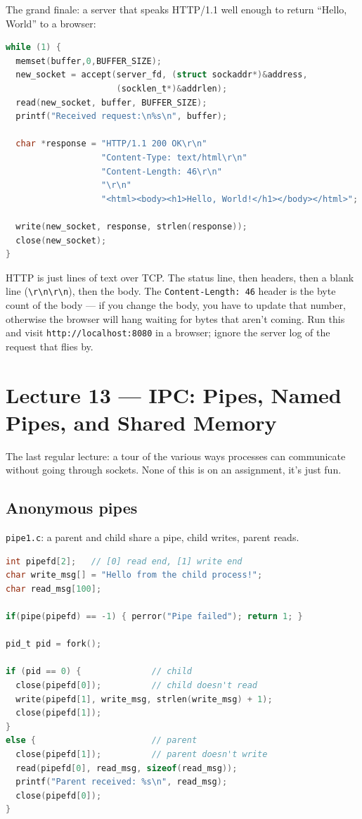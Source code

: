\documentclass[11pt]{article}
\begin{document}
The grand finale: a server that speaks HTTP/1.1 well enough to
return ``Hello, World'' to a browser:

\begin{lstlisting}[language=C]
while (1) {
  memset(buffer,0,BUFFER_SIZE);
  new_socket = accept(server_fd, (struct sockaddr*)&address,
                      (socklen_t*)&addrlen);
  read(new_socket, buffer, BUFFER_SIZE);
  printf("Received request:\n%s\n", buffer);

  char *response = "HTTP/1.1 200 OK\r\n"
                   "Content-Type: text/html\r\n"
                   "Content-Length: 46\r\n"
                   "\r\n"
                   "<html><body><h1>Hello, World!</h1></body></html>";

  write(new_socket, response, strlen(response));
  close(new_socket);
}
\end{lstlisting}

HTTP is just lines of text over TCP. The status line, then headers,
then a blank line (\texttt{\textbackslash r\textbackslash n\textbackslash r\textbackslash n}),
then the body. The \texttt{Content-Length: 46} header is the byte
count of the body --- if you change the body, you have to update
that number, otherwise the browser will hang waiting for bytes that
aren't coming. Run this and visit \texttt{http://localhost:8080} in
a browser; ignore the server log of the request that flies by.

\section{Lecture 13 --- IPC: Pipes, Named Pipes, and Shared Memory}

The last regular lecture: a tour of the various ways processes can
communicate without going through sockets. None of this is on an
assignment, it's just fun.

\subsection*{Anonymous pipes}

\texttt{pipe1.c}: a parent and child share a pipe, child writes,
parent reads.

\begin{lstlisting}[language=C]
int pipefd[2];   // [0] read end, [1] write end
char write_msg[] = "Hello from the child process!";
char read_msg[100];

if(pipe(pipefd) == -1) { perror("Pipe failed"); return 1; }

pid_t pid = fork();

if (pid == 0) {              // child
  close(pipefd[0]);          // child doesn't read
  write(pipefd[1], write_msg, strlen(write_msg) + 1);
  close(pipefd[1]);
}
else {                       // parent
  close(pipefd[1]);          // parent doesn't write
  read(pipefd[0], read_msg, sizeof(read_msg));
  printf("Parent received: %s\n", read_msg);
  close(pipefd[0]);
}
\end{lstlisting}
\end{document}
